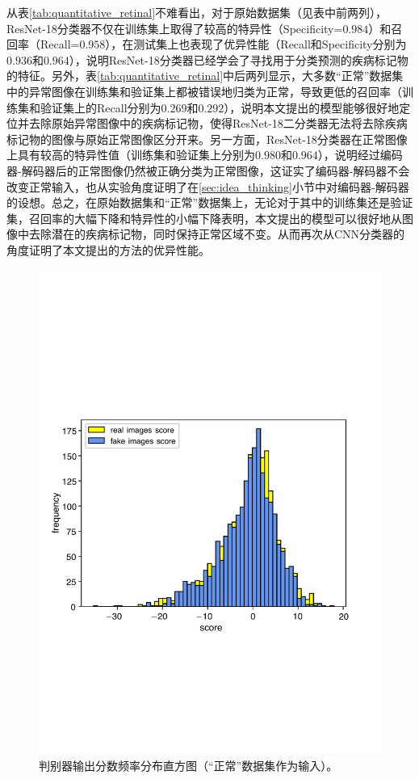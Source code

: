 从表\ref{tab:quantitative_retinal}不难看出，对于原始数据集（见表中前两列），ResNet-18分类器不仅在训练集上取得了较高的特异性（Specificity=$0.984$）和召回率（Recall=$0.958$），在测试集上也表现了优异性能（Recall和Specificity分别为$0.936$和$0.964$），说明ResNet-18分类器已经学会了寻找用于分类预测的疾病标记物的特征。另外，表\ref{tab:quantitative_retinal}中后两列显示，大多数“正常”数据集中的异常图像在训练集和验证集上都被错误地归类为正常，导致更低的召回率（训练集和验证集上的Recall分别为$0.269$和$0.292$），说明本文提出的模型能够很好地定位并去除原始异常图像中的疾病标记物，使得ResNet-18二分类器无法将去除疾病标记物的图像与原始正常图像区分开来。另一方面，ResNet-18分类器在正常图像上具有较高的特异性值（训练集和验证集上分别为$0.980$和$0.964$），说明经过编码器-解码器后的正常图像仍然被正确分类为正常图像，这证实了编码器-解码器不会改变正常输入，也从实验角度证明了在\ref{sec:idea_thinking}小节中对编码器-解码器的设想。总之，在原始数据集和“正常”数据集上，无论对于其中的训练集还是验证集，召回率的大幅下降和特异性的小幅下降表明，本文提出的模型可以很好地从图像中去除潜在的疾病标记物，同时保持正常区域不变。从而再次从CNN分类器的角度证明了本文提出的方法的优异性能。
\begin{figure}[h]
	\centering
	\includegraphics[width=1.0\textwidth]{figure/score_distribution}
	\caption[判别器输出分数频率分布直方图（“正常”数据集作为输入）]{判别器输出分数频率分布直方图（“正常”数据集作为输入）。}
	\label{fig:hist_freq}
\end{figure}
